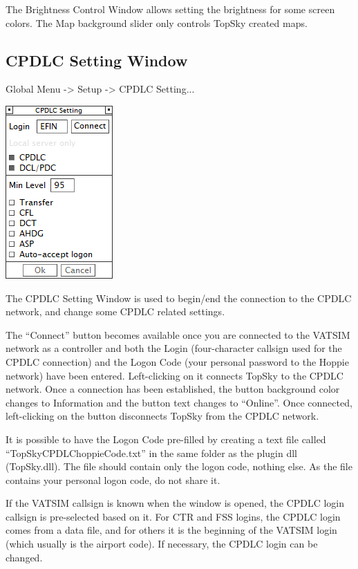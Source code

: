 \documentclass[11pt,a4paper]{memoir}
\newenvironment{Note}
  {\begin{shaded}\marginnote{\fbox{Note}}}
  {\end{shaded}}
\begin{document}
The Brightness Control Window allows setting the brightness for some screen colors. The Map background slider only controls TopSky created maps.

\subsection{CPDLC Setting Window}
\label{win:dls}

Global Menu -> Setup -> CPDLC Setting...

\includegraphics{img/dlsetup.png}

The CPDLC Setting Window is used to begin/end the connection to the CPDLC network, and change some CPDLC related settings.

The “Connect” button becomes available once you are connected to the VATSIM network as a controller and both the Login (four-character callsign used for the CPDLC connection) and the Logon Code (your personal password to the Hoppie network) have been entered. Left-clicking on it connects TopSky to the CPDLC network. Once a connection has been established, the button background color changes to Information and the button text changes to “Online”. Once connected, left-clicking on the button disconnects TopSky from the CPDLC network.

\begin{Note}
    It is possible to have the Logon Code pre-filled by creating a text file called “TopSkyCPDLChoppieCode.txt” in the same folder as the plugin dll (TopSky.dll). The file should contain only the logon code, nothing else. As the file contains your personal logon code, do not share it.
\end{Note}

If the VATSIM callsign is known when the window is opened, the CPDLC login callsign is pre-selected based on it. For CTR and FSS logins, the CPDLC login comes from a data file, and for others it is the beginning of the VATSIM login (which usually is the airport code). If necessary, the CPDLC login can be changed.
\end{document}
